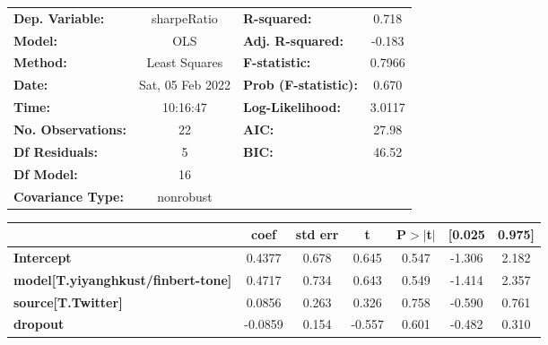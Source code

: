 \begin{center}
\begin{tabular}{lclc}
\toprule
\textbf{Dep. Variable:}                    &   sharpeRatio    & \textbf{  R-squared:         } &     0.718   \\
\textbf{Model:}                            &       OLS        & \textbf{  Adj. R-squared:    } &    -0.183   \\
\textbf{Method:}                           &  Least Squares   & \textbf{  F-statistic:       } &    0.7966   \\
\textbf{Date:}                             & Sat, 05 Feb 2022 & \textbf{  Prob (F-statistic):} &    0.670    \\
\textbf{Time:}                             &     10:16:47     & \textbf{  Log-Likelihood:    } &    3.0117   \\
\textbf{No. Observations:}                 &          22      & \textbf{  AIC:               } &     27.98   \\
\textbf{Df Residuals:}                     &           5      & \textbf{  BIC:               } &     46.52   \\
\textbf{Df Model:}                         &          16      & \textbf{                     } &             \\
\textbf{Covariance Type:}                  &    nonrobust     & \textbf{                     } &             \\
\bottomrule
\end{tabular}
\begin{tabular}{lcccccc}
                                           & \textbf{coef} & \textbf{std err} & \textbf{t} & \textbf{P$> |$t$|$} & \textbf{[0.025} & \textbf{0.975]}  \\
\midrule
\textbf{Intercept}                         &       0.4377  &        0.678     &     0.645  &         0.547        &       -1.306    &        2.182     \\
\textbf{model[T.yiyanghkust/finbert-tone]} &       0.4717  &        0.734     &     0.643  &         0.549        &       -1.414    &        2.357     \\
\textbf{source[T.Twitter]}                 &       0.0856  &        0.263     &     0.326  &         0.758        &       -0.590    &        0.761     \\
\textbf{dropout}                           &      -0.0859  &        0.154     &    -0.557  &         0.601        &       -0.482    &        0.310     \\

\end{tabular}
\end{center}
